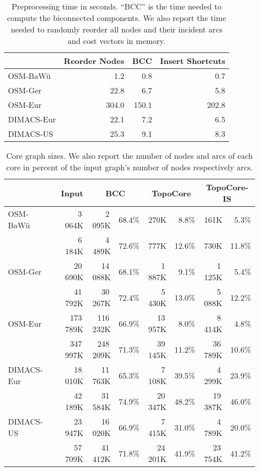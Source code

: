 \documentclass{sig-alternate}
\begin{document}
\begin{table}
\caption{\label{tab:prepro}Preprocessing time in seconds. ``BCC'' is the
time needed to compute the biconnected components. We also report
the time needed to randomly reorder all nodes and their incident arcs
and cost vectors in memory. }
\begin{centering}
\begin{tabular}{lrrr}
\toprule
 & Reorder Nodes & BCC & Insert Shortcuts\tabularnewline
\midrule 
OSM-BaWü & 1.2 & 0.8 & 0.7\tabularnewline
OSM-Ger & 22.8 & 6.7 & 5.8\tabularnewline
OSM-Eur & 304.0 & 150.1 & 202.8\tabularnewline
DIMACS-Eur & 22.1 & 7.2 & 6.5\tabularnewline
DIMACS-US & 25.3 & 9.1 & 8.3\tabularnewline
\bottomrule
\end{tabular}
\par\end{centering}
\end{table}

\begin{table*}
\caption{\label{tab:core-size}Core graph sizes. We also report the number of nodes and arcs of each core in percent of the input graph's number of nodes respectively arcs.}
\begin{centering}
\begin{tabular}{llrrrrrrr}
\toprule
 &  & Input & \multicolumn{2}{c}{BCC} & \multicolumn{2}{c}{TopoCore} & \multicolumn{2}{c}{TopoCore-IS}\tabularnewline
\midrule
OSM-BaWü &  & 3\,064K & 2\,095K & 68.4\% & 270K & 8.8\% & 161K & 5.3\%\tabularnewline
 &  & 6\,184K & 4\,489K & 72.6\% & 777K & 12.6\% & 730K & 11.8\%\tabularnewline
 \addlinespace
OSM-Ger &  & 20\,690K & 14\,088K & 68.1\% & 1\,887K & 9.1\% & 1\,125K & 5.4\%\tabularnewline
 &  & 41\,792K & 30\,267K & 72.4\% & 5\,430K & 13.0\% & 5\,088K & 12.2\%\tabularnewline
 \addlinespace
OSM-Eur &  & 173\,789K & 116\,232K & 66.9\% & 13\,957K & 8.0\% & 8\,414K & 4.8\%\tabularnewline
 &  & 347\,997K & 248\,209K & 71.3\% & 39\,145K & 11.2\% & 36\,789K & 10.6\%\tabularnewline
 \addlinespace
DIMACS-Eur &  & 18\,010K & 11\,763K & 65.3\% & 7\,108K & 39.5\% & 4\,299K & 23.9\%\tabularnewline
 &  & 42\,189K & 31\,584K & 74.9\% & 20\,347K & 48.2\% & 19\,387K & 46.0\%\tabularnewline
 \addlinespace
DIMACS-US &  & 23\,947K & 16\,020K & 66.9\% & 7\,415K & 31.0\% & 4\,789K & 20.0\%\tabularnewline
 &  & 57\,709K & 41\,412K & 71.8\% & 24\,201K & 41.9\% & 23\,754K & 41.2\%\tabularnewline
 \bottomrule
\end{tabular}
\par\end{centering}
\end{table*}
\end{document}
